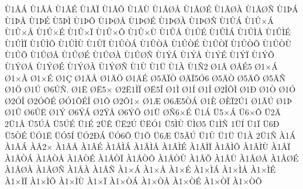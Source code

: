 {^^d91^^c3^^c1
^^d91^^c3^^c5
^^d91^^c3^^c9
^^d91^^c3^^cf
^^d91^^c3^^d5
^^d91^^c3^^d9
^^d91^^c3^^d8^^c5
^^d91^^c3^^d8^^c9
^^d91^^c3^^d8^^c0
^^d91^^c3^^d8^^d1
^^d91^^de^^c1
^^d91^^de^^c5
^^d91^^de^^c9
^^d95^^de^^cc
^^d91^^de^^d5
^^d91^^de^^d8^^c5
^^d91^^de^^d8^^c9
^^d91^^de^^d8^^c0
^^d91^^de^^d8^^d1
^^d91^^db^^c1
^^d91^^db^^d7^^c1
^^d91^^db^^d7^^c5
^^d91^^db^^d7^^c9
^^d91^^db^^d7^^cf
^^d91^^db^^d7^^d5
^^d91^^db^^d7^^d9
^^d91^^db^^c5
^^d91^^db^^c9
^^d91^^db^^cc^^c1
^^d91^^db^^cc^^c5
^^d91^^db^^cc^^c9
^^d91^^db^^cc^^cf
^^d91^^db^^cc^^d5
^^d91^^db^^cc^^d9
^^d91^^db^^cf
^^d91^^db^^d2^^c1
^^d91^^db^^d2^^c5
^^d91^^db^^d2^^c9
^^d91^^db^^d2^^cf
^^d91^^db^^d2^^d5
^^d91^^db^^d2^^d9
^^d91^^db^^d5
^^d91^^db^^d8^^c5
^^d91^^db^^d8^^c9
^^d91^^db^^d8^^c0
^^d91^^db^^d8^^d1
^^d91^^dd^^c1
^^d91^^dd^^c5
^^d91^^dd^^c9
^^d91^^dd^^cf
^^d91^^dd^^d5
^^d91^^dd^^d8^^c5
^^d91^^dd^^d8^^c9
^^d91^^dd^^d8^^c0
^^d91^^dd^^d8^^d1
^^d91^^d9
^^d91^^dc
^^d91^^c0
^^d91^^d12
^^d81^^c2
^^d8^^c2^^c95
^^d81^^d7^^c1
^^d81^^d7^^c5
^^d81^^d7^^c9
^^d81^^c7
^^d81^^c4^^c5
^^d81^^c4^^d6
^^d81^^c4^^c9
^^d85^^c4^^cf^^d2
^^d8^^c4^^cf5^^d36
^^d85^^c4^^d2
^^d85^^c4^^d5
^^d85^^c4^^d1
^^d81^^d6
^^d81^^da
^^d86^^da^^d1.
^^d81^^cb
^^d8^^cb5^^d7
^^d82^^cb1^^cc^^cf
^^d8^^cb5^^ce
^^d81^^cc
^^d81^^cd
^^d81^^ce
^^d82^^ce^^d5^^cc
^^d81^^d0
^^d81^^d2
^^d81^^d3
^^d82^^d3^^ce
^^d82^^d3^^d4^^c9
^^d8^^d31^^d4^^c9^^ce
^^d81^^d4
^^d82^^d41^^d7
^^d81^^c6
^^d86^^c65^^d2^^c1
^^d81^^c8
^^d8^^c8^^cf2^^da1
^^d81^^c3^^da
^^d81^^de
^^d81^^db
^^d86^^db^^cb
^^d81^^dd
^^d86^^dd^^c1
^^d82^^dd^^c5
^^d86^^dd^^d5
^^d81^^dc
^^d8^^d16^^d7^^c9
^^dc1^^c1
^^dc5^^d7^^c1
^^dc6^^d7^^d4
^^dc2^^c4
2^^dc1^^c5
^^dc5^^da^^c5
^^dc5^^da^^c9
^^dc1^^c9
2^^dc^^ca
^^dc^^cb2^^da
^^dc^^cb^^d31
^^dc5^^cc^^d9
^^dc^^cc^^d85
^^dc1^^cc^^d1
1^^dc^^cd
^^dc1^^cf
^^dc6^^d0
^^dc5^^d2^^c9
^^dc^^d31^^cb
^^dc^^d35^^cd
^^dc^^d32^^d0^^c1
^^dc^^d36^^d4
^^dc1^^d5
^^dc6^^c6
^^dc5^^c3^^da
^^dc1^^d9
^^dc1^^dc
^^dc1^^c0
2^^dc1^^d1
^^c01^^c1
^^c01^^c2^^c1
^^c0^^c22^^d7
^^c01^^c2^^c5
^^c01^^c2^^c9
^^c01^^c2^^cc^^c1
^^c01^^c2^^cc^^c5
^^c01^^c2^^cc^^c9
^^c01^^c2^^cc^^cf
^^c01^^c2^^cc^^d5
^^c01^^c2^^cc^^d9
^^c01^^c2^^cf
^^c01^^c2^^d2^^c1
^^c01^^c2^^d2^^c5
^^c01^^c2^^d2^^c9
^^c01^^c2^^d2^^cf
^^c01^^c2^^d2^^d5
^^c01^^c2^^d2^^d9
^^c01^^c2^^d5
^^c01^^c2^^d9
^^c01^^c2^^d8^^c5
^^c01^^c2^^d8^^c9
^^c01^^c2^^d8^^c0
^^c01^^c2^^d8^^d1
^^c01^^c2^^c0
^^c01^^c2^^d1
^^c01^^d7^^c1
^^c01^^d7^^c5
^^c01^^d7^^c9
^^c01^^d7^^cc^^c1
^^c01^^d7^^cc^^c5
^^c01^^d7^^cc^^c9
^^c01^^d7^^cc^^cf
^^c01^^d7^^cc^^d5
^^c01^^d7^^cc^^d9
^^c01^^d7^^cf
^^c01^^d7^^d2^^c1
^^c01^^d7^^d2^^c5
^^c01^^d7^^d2^^c9
^^c01^^d7^^d2^^cf
^^c01^^d7^^d2^^d5
}
